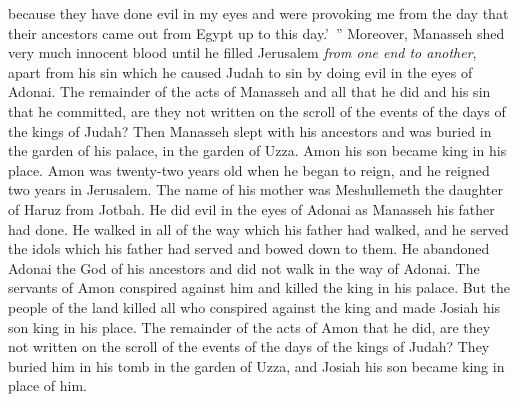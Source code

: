 \begin{biblechapter}
\verse because they have done evil in my eyes and were provoking me from the day that their ancestors came out from Egypt up to this day.’ ”
\verse Moreover, Manasseh shed very much innocent blood until he filled Jerusalem \textit{from one end to another}, apart from his sin which he caused Judah to sin by doing evil in the eyes of Adonai.
\verse The remainder of the acts of Manasseh and all that he did and his sin that he committed, are they not written on the scroll of the events of the days of the kings of Judah?
\verse Then Manasseh slept with his ancestors and was buried in the garden of his palace, in the garden of Uzza. Amon his son became king in his place.
 Amon was twenty-two years old when he began to reign, and he reigned two years in Jerusalem. The name of his mother was Meshullemeth the daughter of Haruz from Jotbah.
\verse He did evil in the eyes of Adonai as Manasseh his father had done.
\verse He walked in all of the way which his father had walked, and he served the idols which his father had served and bowed down to them.
\verse He abandoned Adonai the God of his ancestors and did not walk in the way of Adonai.
\verse The servants of Amon conspired against him and killed the king in his palace.
\verse But the people of the land killed all who conspired against the king and made Josiah his son king in his place.
\verse The remainder of the acts of Amon that he did, are they not written on the scroll of the events of the days of the kings of Judah?
\verse They buried him in his tomb in the garden of Uzza, and Josiah his son became king in place of him.
\end{biblechapter}

